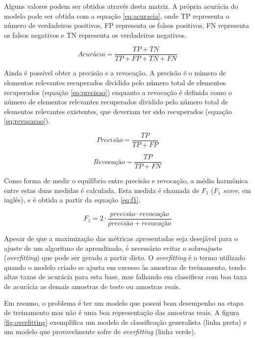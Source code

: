 Alguns valores podem ser obtidos através desta matriz. A própria acurácia do modelo pode ser obtida com a equação \ref{eq:acuracia}, onde TP representa o número de verdadeiros positivos, FP representa os falsos positivos, FN representa os falsos negativos e TN representa os verdadeiros negativos.

\begin{equation}
  \displaystyle Acurácia = \frac{TP+TN}{TP+FP+TN+FN}
\label{eq:acuracia}
\end{equation}

Ainda é possível obter a precisão e a revocação. A precisão é o número de elementos relevantes recuperados dividido pelo número total de elementos recuperados (equação \ref{eq:precisao}) enquanto a revocação é definida como o número de elementos relevantes recuperados dividido pelo número total de elementos relevantes existentes, que deveriam ter sido recuperados (equação \ref{eq:revocacao}).

\begin{equation}
  \displaystyle Precisão = \frac{TP}{TP+FP}
\label{eq:precisao}
\end{equation}

\begin{equation}
  \displaystyle Revocação = \frac{TP}{TP+FN}
\label{eq:revocacao}
\end{equation}

Como forma de medir o equilíbrio entre precisão e revocação, a média harmônica entre estas duas medidas é calculada. Esta medida é chamada de $F_1$ ($F_1$ \textit{score}, em inglês), e é obtida a partir da equação \ref{eq:f1}.

\begin{equation}
  \displaystyle F_1 = 2 \cdot \frac{precisão \cdot revocação}{precisão + revocação}
\label{eq:f1}
\end{equation}

Apesar de que a maximização das métricas apresentadas seja desejável para o ajuste de um algoritmo de aprendizado, é necessário evitar o sobreajuste (\textit{overfitting}) que pode ser gerado a partir disto. O \textit{overfitting} é o termo utilizado quando o modelo criado se ajusta em excesso às amostras de treinamento, tendo altas taxas de acurácia para esta base, mas falhando em classificar com boa taxa de acurácia as demais amostras de teste ou amostras reais.

Em resumo, o problema é ter um modelo que possui bom desempenho na etapa de treinamento mas não é uma boa representação das amostras reais. A figura \ref{fig:overfitting} exemplifica um modelo de classificação generalista (linha preta) e um modelo que provavelmente sofre de \textit{overfitting} (linha verde).

